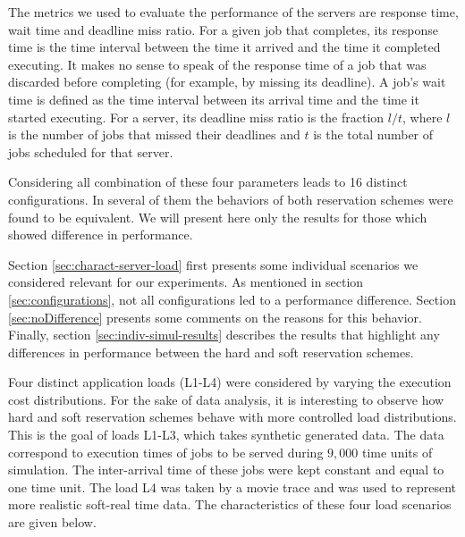 \documentclass[times, 10pt,twocolumn]{article}
\begin{document}
The metrics we used to evaluate the performance of the servers are
response time, wait time and deadline miss ratio. For a given job that
completes, its response time is the time interval between the time it
arrived and the time it completed executing. It makes no sense to
speak of the response time of a job that was discarded before
completing (for example, by missing its deadline). A job's wait time
is defined as the time interval between its arrival time and the time
it started executing. For a server, its deadline miss ratio is the
fraction $l/t$, where $l$ is the number of jobs that missed their
deadlines and $t$ is the total number of jobs scheduled for that
server.

Considering all combination of these four parameters leads to 16
distinct configurations. In several of them the behaviors of both
reservation schemes were found to be equivalent.  We will present here
only the results for those which showed difference in performance.

\label{sec:simulation-results}

Section \ref{sec:charact-server-load} first presents some individual
scenarios we considered relevant for our experiments. As mentioned in
section \ref{sec:configurations}, not all configurations led to a
performance difference. Section \ref{sec:noDifference} presents some
comments on the reasons for this behavior. Finally, section
\ref{sec:indiv-simul-results} describes the results that highlight any
differences in performance between the hard and soft reservation
schemes.

\label{sec:charact-server-load}

Four distinct application loads (L1-L4) were considered by varying the
execution cost distributions.  For the sake of data analysis, it is
interesting to observe how hard and soft reservation schemes behave
with more controlled load distributions. This is the goal of loads
L1-L3, which takes synthetic generated data. The data correspond to
execution times of jobs to be served during $9,000$ time units of
simulation.  The inter-arrival time of these jobs were kept constant
and equal to one time unit.  The load L4 was taken by a movie trace
and was used to represent more realistic soft-real time data. The
characteristics of these four load scenarios are given below.
\end{document}
